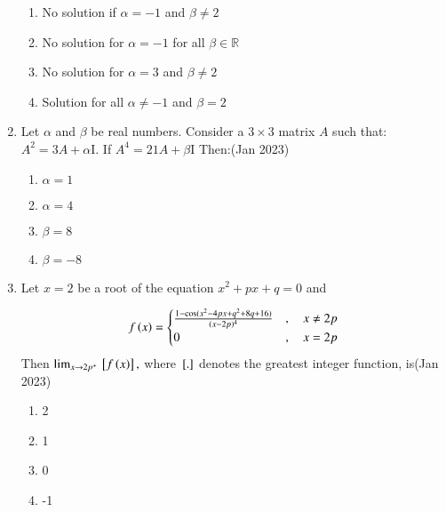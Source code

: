 \documentclass[journal,12pt,onecolumn]{IEEEtran}
\theoremstyle{remark}
\begin{document}
\begin{enumerate}
   \begin{enumerate}
       \item No solution if $\alpha = -1$  and $\beta \neq 2$
       \item No solution for $\alpha = -1$ for all $\beta \in \mathbb{R}$
       \item No solution for $\alpha = 3$ and $\beta \neq 2$
       \item Solution for all $\alpha \neq -1$ and $\beta = 2$
   \end{enumerate}

\item Let $\alpha$ and $\beta$ be real numbers. Consider a $ 3 \times 3$ matrix $A$ such that:$A^2 = 3A + \alpha$I. If $A^4 = 21A + \beta$I   Then:\hfill(Jan 2023)
\begin{multicols}{4}
   \begin{enumerate}
       \item $\alpha = 1$
       \item $\alpha = 4$
       \item $\beta = 8$
       \item $\beta = -8$
   \end{enumerate}
\end{multicols}
\item Let \( x = 2 \) be a root of the equation $x^2 + px + q = 0$ and 

\begin{align*}
f\left(x\right) = 
\begin{cases} 
\frac{1 - \cos(x^2 - 4px + q^2 + 8q + 16)}{(x - 2p)^4} & , \quad x \neq 2p \\
0 & , \quad x = 2p 
\end{cases}
\end{align*}
Then  $\lim_{x \to 2p^+} {}\left[f\left(x\right)\right],$ where ${}\left[.\right]$ denotes the greatest integer function, is\hfill(Jan 2023)
\begin{multicols}{4}
    \begin{enumerate}
    \item 2 
    \item 1
    \item 0 
    \item -1
\end{enumerate}
\end{multicols}


\end{enumerate}
\end{document}
